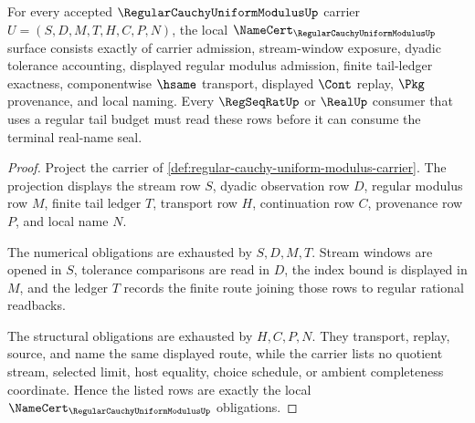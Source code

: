 \begin{theorem}
\label{thm:regular-cauchy-uniform-modulus-namecert-obligations}
For every accepted $\RegularCauchyUniformModulusUp$ carrier
$U=(S,D,M,T,H,C,P,N)$, the local
$\NameCert_{\RegularCauchyUniformModulusUp}$ surface consists exactly of carrier admission, stream-window exposure, dyadic tolerance accounting, displayed regular modulus admission, finite tail-ledger exactness, componentwise $\hsame$ transport, displayed $\Cont$ replay, $\Pkg$ provenance, and local naming. Every $\RegSeqRatUp$ or $\RealUp$ consumer that uses a regular tail budget must read these rows before it can consume the terminal real-name seal.
\end{theorem}
\begin{proof}
Project the carrier of \autoref{def:regular-cauchy-uniform-modulus-carrier}. The projection displays the stream row $S$, dyadic observation row $D$, regular modulus row $M$, finite tail ledger $T$, transport row $H$, continuation row $C$, provenance row $P$, and local name $N$.

The numerical obligations are exhausted by $S,D,M,T$. Stream windows are opened in $S$, tolerance comparisons are read in $D$, the index bound is displayed in $M$, and the ledger $T$ records the finite route joining those rows to regular rational readbacks.

The structural obligations are exhausted by $H,C,P,N$. They transport, replay, source, and name the same displayed route, while the carrier lists no quotient stream, selected limit, host equality, choice schedule, or ambient completeness coordinate. Hence the listed rows are exactly the local $\NameCert_{\RegularCauchyUniformModulusUp}$ obligations.
\end{proof}

